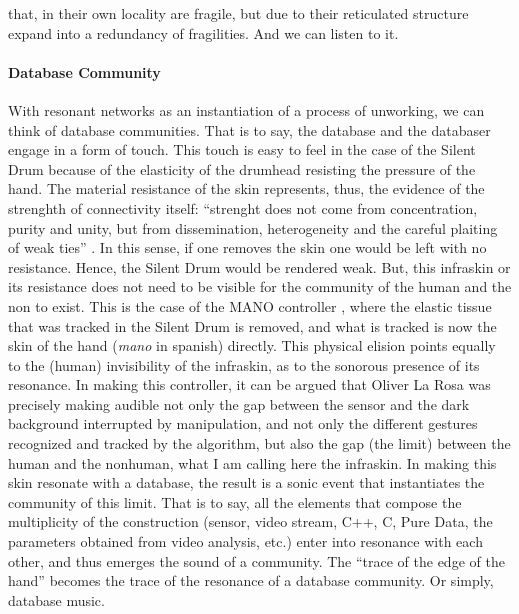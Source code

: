  that, in their own locality are fragile, but due to their reticulated structure expand into a redundancy of fragilities. And we can listen to it.

\paragraph{Database Community}
With resonant networks as an instantiation of a process of unworking, we can think of database communities. That is to say, the database and the databaser engage in a form of touch. This touch is easy to feel in the case of the Silent Drum because of the elasticity of the drumhead resisting the pressure of the hand. The material resistance of the skin represents, thus, the evidence of the strenghth of connectivity itself: ``strenght does not come from concentration, purity and unity, but from dissemination, heterogeneity and the careful plaiting of weak ties'' \parencite[3]{Lat90:On}. In this sense, if one removes the skin one would be left with no resistance. Hence, the Silent Drum would be rendered weak. But, this infraskin or its resistance does not need to be visible for the community of the human and the non to exist. This is the case of the MANO controller \parencite{DBLP:conf/icmc/OliverJ10}, where the elastic tissue that was tracked in the Silent Drum is removed, and what is tracked is now the skin of the hand (\textit{mano} in spanish) directly. This physical elision points equally to the (human) invisibility of the infraskin, as to the sonorous presence of its resonance. In making this controller, it can be argued that Oliver La Rosa was precisely making audible not only the gap between the sensor and the dark background interrupted by manipulation, and not only the different gestures recognized and tracked by the algorithm, but also the gap (the limit) between the human and the nonhuman, what I am calling here the infraskin. In making this skin resonate with a database, the result is a sonic event that instantiates the community of this limit. That is to say, all the elements that compose the multiplicity of the construction (sensor, video stream, C++, C, Pure Data, the parameters obtained from video analysis, etc.) enter into resonance with each other, and thus emerges the sound of a community. The ``trace of the edge of the hand'' \parencite[2]{DBLP:conf/icmc/OliverJ10} becomes the trace of the resonance of a database community. Or simply, database music.

